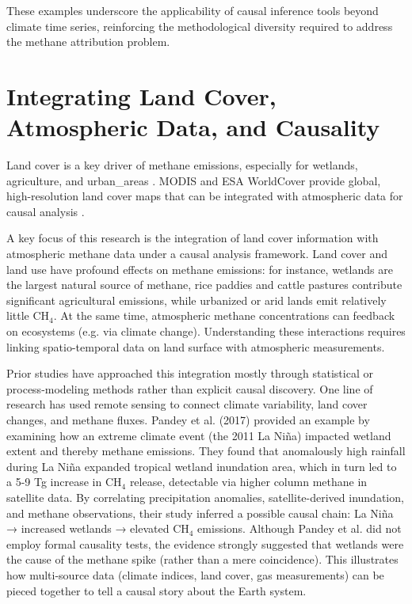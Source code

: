 These examples underscore the applicability of causal inference tools beyond climate time series, reinforcing the methodological diversity required to address the methane attribution problem.

\section{Integrating Land Cover, Atmospheric Data, and Causality}
Land cover is a key driver of methane emissions, especially for wetlands, agriculture, and \gls{urban_areas} \cite{Saunois2020, Karoff2023}. MODIS and ESA WorldCover provide global, high-resolution land cover maps that can be integrated with atmospheric data for causal analysis \cite{Friedl2010, Zhang2021}.

A key focus of this research is the integration of land cover information with atmospheric methane data under a causal analysis framework. Land cover and land use have profound effects on methane emissions: for instance, wetlands are the largest natural source of methane, rice paddies and cattle pastures contribute significant agricultural emissions, while urbanized or arid lands emit relatively little CH$_4$. At the same time, atmospheric methane concentrations can feedback on ecosystems (e.g. via climate change). Understanding these interactions requires linking spatio-temporal data on land surface with atmospheric measurements.

Prior studies have approached this integration mostly through statistical or process-modeling methods rather than explicit causal discovery. One line of research has used remote sensing to connect climate variability, land cover changes, and methane fluxes. Pandey et al. (2017) \cite{Pandey2017} provided an example by examining how an extreme climate event (the 2011 La Ni\~na) impacted wetland extent and thereby methane emissions. They found that anomalously high rainfall during La Ni\~na expanded tropical wetland inundation area, which in turn led to a 5-9 Tg increase in CH$_4$ release, detectable via higher column methane in satellite data. By correlating precipitation anomalies, satellite-derived inundation, and methane observations, their study inferred a possible causal chain: La Ni\~na → increased wetlands → elevated CH$_4$ emissions. Although Pandey et al. did not employ formal causality tests, the evidence strongly suggested that wetlands were the cause of the methane spike (rather than a mere coincidence). This illustrates how multi-source data (climate indices, land cover, gas measurements) can be pieced together to tell a causal story about the Earth system.

